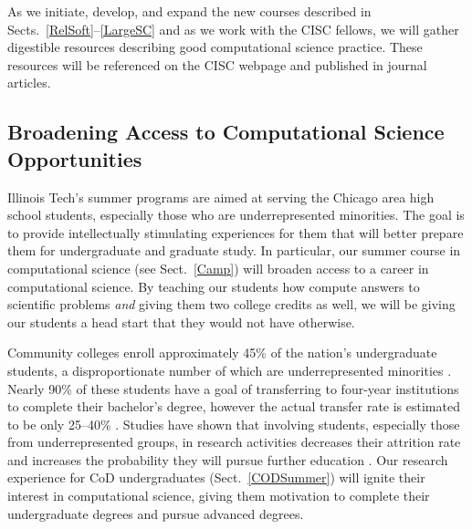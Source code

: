 \documentclass[11pt]{NSFamsart}
\begin{document}
As we initiate, develop, and expand the new courses described in Sects.~\ref{RelSoft}--\ref{LargeSC} and as we work with the CISC fellows, we will gather digestible resources describing good computational science practice. These resources will be referenced on the CISC webpage and published in journal articles. 

\subsection{Broadening Access to Computational Science Opportunities}
Illinois Tech's summer programs are aimed at serving the Chicago area high school students, especially those who are underrepresented minorities.  The goal is to provide intellectually stimulating experiences for them that will better prepare them for undergraduate and graduate study. 
In particular, our  summer course in computational science (see Sect.~\ref{Camp}) will broaden access to a career in computational science.  By teaching our students how compute answers to scientific problems \emph{and} giving them two college credits as well, we will be giving our students a head start that they would not have otherwise.

Community colleges enroll approximately 45\% of the nation's undergraduate students, a disproportionate number of which are underrepresented minorities \cite{KnappKG12,nsfreport13}.  Nearly 90\% of these students have a goal of transferring to four-year institutions to complete their bachelor's degree, however the actual transfer rate is estimated to be only 25--40\% \cite{HoachlanderSH03,MelguizoKA11}.  Studies have shown that involving students, especially those from underrepresented groups, in  research activities decreases  their attrition rate and increases the probability they will pursue further education \cite{BarlowV04,JonesBV10}.  Our research experience for CoD undergraduates (Sect.~\ref{CODSummer}) will ignite their interest in computational science, giving them motivation to complete their undergraduate degrees and pursue advanced degrees.
\end{document}
